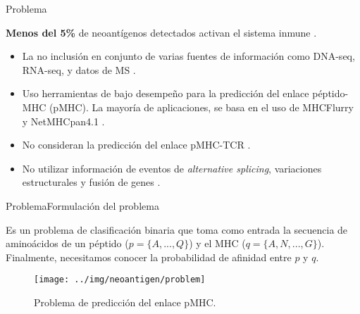 \documentclass[10pt]{beamer}
\newcommand{\1}{
	\setbeamertemplate{background}{
		\texttt{[image: img/1]}
		\tikz[overlay] \fill[fill opacity=0.75,fill=white] (0,0) rectangle (-\paperwidth,\paperheight);
	}
}
\begin{document}
\begin{frame}{Problema}{}	
	\begin{block}{}
		\textbf{Menos del 5\%} de neoantígenos detectados activan el sistema inmune \cite{de2020neoantigen, mill2022neoms, bulik2019deep, bassani2015mass, yadav2014predicting}.
	\end{block}
	
	\pause
	\begin{block}{}
		\begin{itemize} 
			\item La no inclusión en conjunto de varias fuentes de información como DNA-seq, RNA-seq, y datos de MS \cite{kim2018neopepsee}. \pause
			\item  Uso herramientas de bajo desempeño para la predicción del enlace péptido-MHC (pMHC). La mayoría de aplicaciones, se basa en el uso de MHCFlurry \cite{o2020mhcflurry} y NetMHCpan4.1 \cite{reynisson2020netmhcpan}. \pause
			\item No consideran  la predicción del enlace pMHC-TCR  \cite{rubinsteyn2018computational}. \pause
			\item No utilizar información de eventos de \textit{alternative splicing}, variaciones estructurales y  fusión de genes \cite{wood2020neoepiscope}.
		\end{itemize}
	\end{block}
	
\end{frame}

\begin{frame}{Problema}{Formulación del problema}
	\begin{block}{}
		Es un problema de clasificación binaria que toma como entrada la secuencia de aminoácidos de un péptido ($p = \{A, ..., Q\}$) y el MHC ($q = \{A, N, ..., G\}$). Finalmente, necesitamos conocer la probabilidad de afinidad entre $p$ y $q$.
	\end{block}
	
	\begin{figure}
		\texttt{[image: ../img/neoantigen/problem]}
		\caption{Problema de predicción del enlace pMHC.}
	\end{figure}
\end{frame}
\end{document}
